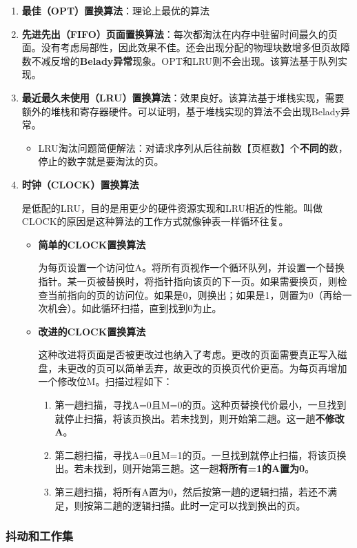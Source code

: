 \documentclass[12pt, a4paper, oneside]{ctexart}
\begin{document}
\begin{enumerate}
  \item {\bf 最佳（OPT）置换算法}：理论上最优的算法
  \item {\bf 先进先出（FIFO）页面置换算法}：每次都淘汰在内存中驻留时间最久的页面。没有考虑局部性，因此效果不佳。还会出现分配的物理块数增多但页故障数不减反增的\textbf{Belady异常}现象。OPT和LRU则不会出现。该算法基于队列实现。
  \item {\bf 最近最久未使用（LRU）置换算法}：效果良好。该算法基于堆栈实现，需要额外的堆栈和寄存器硬件。可以证明，基于堆栈实现的算法不会出现Belady异常。
  \begin{itemize}
    \item LRU淘汰问题简便解法：对请求序列从后往前数【页框数】个\textbf{不同的}数，停止的数字就是要淘汰的页。
  \end{itemize}
  \item {\bf 时钟（CLOCK）置换算法}
  
  是低配的LRU，目的是用更少的硬件资源实现和LRU相近的性能。叫做CLOCK的原因是这种算法的工作方式就像钟表一样循环往复。
  \begin{itemize}
    \item {\bf 简单的CLOCK置换算法}
    
    为每页设置一个访问位A。将所有页视作一个循环队列，并设置一个替换指针。某一页被替换时，将指针指向该页的下一页。如果需要换页，则检查当前指向的页的访问位。如果是0，则换出；如果是1，则置为0（再给一次机会）。如此循环扫描，直到找到0为止。
    \item {\bf 改进的CLOCK置换算法}
    
    这种改进将页面是否被更改过也纳入了考虑。更改的页面需要真正写入磁盘，未更改的页可以简单丢弃，故更改的页换页代价更高。为每页再增加一个修改位M。扫描过程如下：
    \begin{enumerate}
      \item 第一趟扫描，寻找A=0且M=0的页。这种页替换代价最小，一旦找到就停止扫描，将该页换出。若未找到，则开始第二趟。这一趟\textbf{不修改A}。
      \item 第二趟扫描，寻找A=0且M=1的页。一旦找到就停止扫描，将该页换出。若未找到，则开始第三趟。这一趟\textbf{将所有=1的A置为0}。
      \item 第三趟扫描，将所有A置为0，然后按第一趟的逻辑扫描，若还不满足，则按第二趟的逻辑扫描。此时一定可以找到换出的页。
    \end{enumerate}
  \end{itemize}
\end{enumerate}

\subsubsection{抖动和工作集}
\end{document}
